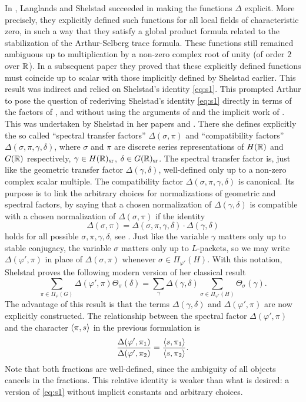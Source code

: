 \documentclass{article}
\theoremstyle{definition}
\numberwithin{equation}{section}
\renewcommand{\-}{\hyp{}}
\begin{document}
In \cite{LS87}, Langlands and Shelstad succeeded in making the functions $\Delta$ explicit. More precisely, they explicitly defined such functions for all local fields of characteristic zero, in such a way that they satisfy a global product formula related to the stabilization of the Arthur-Selberg trace formula. These functions still remained ambiguous up to multiplication by a non-zero complex root of unity (of order $2$ over $\mathbb{R}$). In a subsequent paper \cite[Theorem 2.6.A]{LS90} they proved that these explicitly defined functions must coincide up to scalar with those implicitly defined by Shelstad earlier. This result was indirect and relied on Shelstad's identity \eqref{eq:s1}. This prompted Arthur to pose the question \cite{Art08} of rederiving Shelstad's identity \eqref{eq:s1} directly in terms of the factors of \cite{LS87}, and without using the arguments of \cite{LS90} and the implicit work of \cite{She82}. This was undertaken by Shelstad in her papers \cite{SheTE1} and \cite{SheTE2}. There she defines explicitly the so called ``spectral transfer factors'' $\Delta(\sigma,\pi)$ and ``compatibility factors'' $\Delta(\sigma,\pi,\gamma,\delta)$, where $\sigma$ and $\pi$ are discrete series representations of $H(\mathbb{R})$ and $G(\mathbb{R})$ respectively, $\gamma \in H(\mathbb{R})_{\textrm{sr}}$, $\delta \in G(\mathbb{R})_{\textrm{sr}}$. The spectral transfer factor is, just like the geometric transfer factor $\Delta(\gamma,\delta)$, well-defined only up to a non-zero complex scalar multiple. The compatibility factor $\Delta(\sigma,\pi,\gamma,\delta)$ is canonical. Its purpose is to link the arbitrary choices for normalizations of geometric and spectral factors, by saying that a chosen normalization of $\Delta(\gamma,\delta)$ is compatible with a chosen normalization of $\Delta(\sigma,\pi)$ if the identity
\[ \Delta(\sigma,\pi)  = \Delta(\sigma,\pi,\gamma,\delta) \cdot \Delta(\gamma,\delta) \]
holds for all possible $\sigma,\pi,\gamma,\delta$, see \cite[\S4]{SheTE2}. Just like the variable $\gamma$ matters only up to stable conjugacy, the variable $\sigma$ matters only up to $L$\-packets, so we may write $\Delta(\varphi',\pi)$ in place of $\Delta(\sigma,\pi)$ whenever $\sigma \in \Pi_{\varphi'}(H)$. With this notation, Shelstad proves the following modern version of her classical result
\begin{equation} \label{eq:s2}
	\sum_{\pi \in \Pi_\varphi(G)}\Delta(\varphi',\pi)\Theta_\pi(\delta) = \sum_\gamma \Delta(\gamma,\delta)\sum_{\sigma \in \Pi_{\varphi'}(H)} \Theta_{\sigma}(\gamma).
\end{equation}
The advantage of this result is that the terms $\Delta(\gamma,\delta)$ and $\Delta(\varphi',\pi)$ are now explicitly constructed. The relationship between the spectral factor $\Delta(\varphi',\pi)$ and the character $\langle\pi,s\rangle$ in the previous formulation is
\[ \frac{\Delta(\varphi',\pi_1)}{\Delta(\varphi',\pi_2)} = \frac{\langle s,\pi_1\rangle}{\langle s,\pi_2\rangle}.\]
Note that both fractions are well-defined, since the ambiguity of all objects cancels in the fractions. This relative identity is weaker than what is desired: a version of \eqref{eq:s1} without implicit constants and arbitrary choices.
\end{document}

